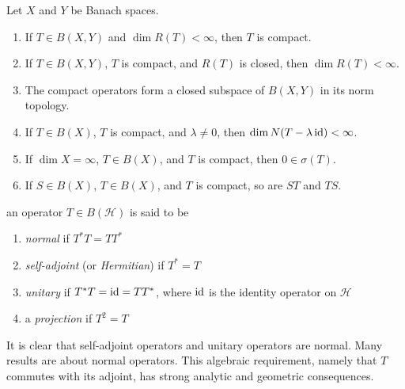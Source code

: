 \begin{theorem}
Let $X$ and $Y$ be Banach spaces.
\begin{enumerate}[label=(\alph*)]
  \item If $T \in B(X, Y)$ and $\dim R(T) < \infty$, then $T$ is compact.
  \item If $T \in B(X, Y)$, $T$ is compact, and $R(T)$ is closed, then $\dim R(T) < \infty$.
  \item The compact operators form a closed subspace of $B(X, Y)$ in its norm topology.
  \item If $T \in B(X)$, $T$ is compact, and $\lambda \neq 0$, then $\dim N(T - \lambda \operatorname{id}) < \infty$.
  \item If $\dim X = \infty$, $T \in B(X)$, and $T$ is compact, then $0 \in \sigma(T)$.
  \item If $S \in B(X)$, $T \in B(X)$, and $T$ is compact, so are $ST$ and $TS$.
  \qedhere
\end{enumerate}
\end{theorem}




\begin{definition}
\label{def:normal-hermitian-unitary-projection}
an operator $T \in B(\mathcal{H})$ is said to be
\begin{enumerate}[label=(\alph*)]
\item \emph{normal} if $T^* T = T T^*$ \label{item:normal}
\item \emph{self-adjoint} (or \emph{Hermitian}) if $T^* = T$ \label{item:hermitian}
\item \emph{unitary} if $T^* T = \operatorname{id} = T T^*$, where $\operatorname{id}$ is the identity operator on $\mathcal{H}$ \label{item:unitary}
\item a \emph{projection} if $T^2 = T$ \label{item:projection}
\qedhere
\end{enumerate}
\end{definition}

It is clear that self-adjoint operators and unitary operators are normal.
Many results are about normal operators.
This algebraic requirement, namely that $T$ commutes with its adjoint, has strong analytic and geometric consequences.


